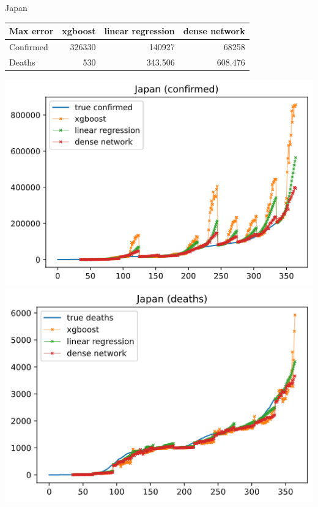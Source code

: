 \documentclass[a4paper,12pt]{article}
\begin{document}
\begin{tcolorbox}
    Japan

    \begin{tabular}{lrrr}
    \toprule
    Max error   &   xgboost &   linear regression &   dense network \\
    \midrule
    Confirmed   &    326330 &          140927     &       68258     \\
    Deaths      &       530 &             343.506 &         608.476 \\
    \bottomrule
    \end{tabular}


    \begin{center}
        \includegraphics[width=\textwidth]{Japan_6-1.png}
        \includegraphics[width=\textwidth]{Japan_6-2.png}
    \end{center}
\end{tcolorbox}
\end{document}
